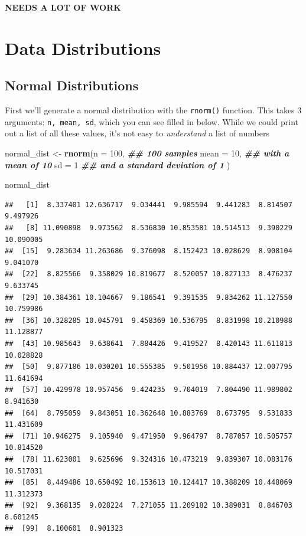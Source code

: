 \documentclass[
]{book}
\newenvironment{Shaded}{\begin{snugshade}}{\end{snugshade}}
\newcommand{\AttributeTok}[1]{\textcolor[rgb]{0.13,0.29,0.53}{#1}}
\newcommand{\DecValTok}[1]{\textcolor[rgb]{0.00,0.00,0.81}{#1}}
\newcommand{\DocumentationTok}[1]{\textcolor[rgb]{0.56,0.35,0.01}{\textbf{\textit{#1}}}}
\newcommand{\FunctionTok}[1]{\textcolor[rgb]{0.13,0.29,0.53}{\textbf{#1}}}
\newcommand{\NormalTok}[1]{#1}
\newcommand{\OtherTok}[1]{\textcolor[rgb]{0.56,0.35,0.01}{#1}}
\begin{document}
\textbf{NEEDS A LOT OF WORK}

\hypertarget{data-distributions}{%
\section{Data Distributions}\label{data-distributions}}

\hypertarget{normal-distributions}{%
\subsection{Normal Distributions}\label{normal-distributions}}

First we'll generate a normal distribution with the \texttt{rnorm()} function. This takes 3 arguments: \texttt{n,\ mean,\ sd}, which you can see filled in below. While we could print out a list of all these values, it's not easy to \emph{understand} a list of numbers

\begin{Shaded}
\begin{Highlighting}[]
\NormalTok{normal\_dist }\OtherTok{\textless{}{-}} \FunctionTok{rnorm}\NormalTok{(}\AttributeTok{n =} \DecValTok{100}\NormalTok{, }\DocumentationTok{\#\# 100 samples}
                     \AttributeTok{mean =} \DecValTok{10}\NormalTok{, }\DocumentationTok{\#\# with a mean of 10}
                     \AttributeTok{sd =} \DecValTok{1} \DocumentationTok{\#\# and a standard deviation of 1}
\NormalTok{                     )}


\NormalTok{normal\_dist}
\end{Highlighting}
\end{Shaded}

\begin{verbatim}
##   [1]  8.337401 12.636717  9.034441  9.985594  9.441283  8.814507  9.497926
##   [8] 11.090898  9.973562  8.536830 10.853581 10.514513  9.390229 10.090005
##  [15]  9.283634 11.263686  9.376098  8.152423 10.028629  8.908104  9.041070
##  [22]  8.825566  9.358029 10.819677  8.520057 10.827133  8.476237  9.633745
##  [29] 10.384361 10.104667  9.186541  9.391535  9.834262 11.127550 10.759986
##  [36] 10.328285 10.045791  9.458369 10.536795  8.831998 10.210988 11.128877
##  [43] 10.985643  9.638641  7.884426  9.419527  8.420143 11.611813 10.028828
##  [50]  9.877186 10.030201 10.555385  9.501956 10.884437 12.007795 11.641694
##  [57] 10.429978 10.957456  9.424235  9.704019  7.804490 11.989802  8.941630
##  [64]  8.795059  9.843051 10.362648 10.883769  8.673795  9.531833 11.431609
##  [71] 10.946275  9.105940  9.471950  9.964797  8.787057 10.505757 10.814520
##  [78] 11.623001  9.625696  9.324316 10.473219  9.839307 10.083176 10.517031
##  [85]  8.449486 10.650492 10.153613 10.124417 10.388209 10.448069 11.312373
##  [92]  9.368135  9.028224  7.271055 11.209182 10.389031  8.846703  8.601245
##  [99]  8.100601  8.901323
\end{verbatim}
\end{document}
